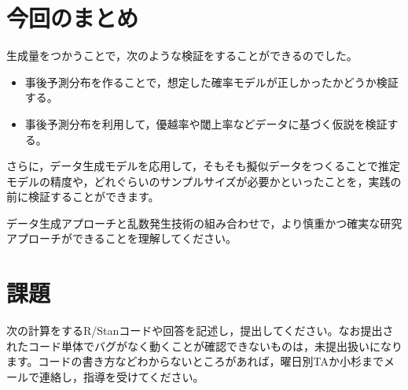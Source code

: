 \documentclass{ltjsbook}
\begin{document}
\section{今回のまとめ}
生成量をつかうことで，次のような検証をすることができるのでした。
\begin{itemize}
    \item 事後予測分布を作ることで，想定した確率モデルが正しかったかどうか検証する。
    \item 事後予測分布を利用して，優越率や閾上率などデータに基づく仮説を検証する。
\end{itemize}
さらに，データ生成モデルを応用して，そもそも擬似データをつくることで推定モデルの精度や，どれぐらいのサンプルサイズが必要かといったことを，実践の前に検証することができます。

データ生成アプローチと乱数発生技術の組み合わせで，より慎重かつ確実な研究アプローチができることを理解してください。

\section{課題}
次の計算をするR/Stanコードや回答を記述し，提出してください。なお提出されたコード単体でバグがなく動くことが確認できないものは，未提出扱いになります。コードの書き方などわからないところがあれば，曜日別TAか小杉までメールで連絡し，指導を受けてください。
\end{document}
